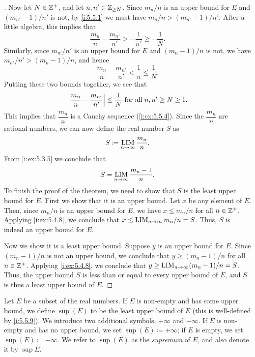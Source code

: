\begin{proof}[]
  Now let \(N \in \mathbb{Z}^+\), and let \(n, n' \in \mathbb{Z}_{\geq N}\).
  Since \(m_n / n\) is an upper bound for \(E\) and \((m_{n'} - 1) / n'\) is not, by \cref{i:5.5.1} we must have \(m_n / n > (m_{n'} - 1) / n'\).
  After a little algebra, this implies that
  \[
    \dfrac{m_n}{n} - \dfrac{m_{n'}}{n'} > -\dfrac{1}{n'} \geq -\dfrac{1}{N}.
  \]
  Similarly, since \(m_{n'} / n'\) is an upper bound for \(E\) and \((m_n - 1) / n\) is not, we have \(m_{n'} / n' > (m_n - 1) / n\), and hence
  \[
    \dfrac{m_n}{n} - \dfrac{m_{n'}}{n'} < \dfrac{1}{n} \leq \dfrac{1}{N}.
  \]
  Putting these two bounds together, we see that
  \[
    \left\lvert\dfrac{m_n}{n} - \dfrac{m_{n'}}{n'}\right\rvert \leq \dfrac{1}{N} \text{ for all } n, n' \geq N \geq 1.
  \]
  This implies that \(\dfrac{m_n}{n}\) is a Cauchy sequence (\cref{i:ex:5.5.4}).
  Since the \(\dfrac{m_n}{n}\) are rational numbers, we can now define the real number \(S\) as
  \[
    S \coloneqq \operatorname*{LIM}_{n \to \infty} \dfrac{m_n}{n}.
  \]
  From \cref{i:ex:5.3.5} we conclude that
  \[
    S = \operatorname*{LIM}_{n \to \infty} \dfrac{m_n - 1}{n}.
  \]
  To finish the proof of the theorem, we need to show that \(S\) is the least upper bound for \(E\).
  First we show that it is an upper bound.
  Let \(x\) be any element of \(E\).
  Then, since \(m_n / n\) is an upper bound for \(E\), we have \(x \leq m_n / n\) for all \(n \in \mathbb{Z}^+\).
  Applying \cref{i:ex:5.4.8}, we conclude that \(x \leq \operatorname*{LIM}_{n \to \infty} m_n / n = S\).
  Thus, \(S\) is indeed an upper bound for \(E\).

  Now we show it is a least upper bound.
  Suppose \(y\) is an upper bound for \(E\).
  Since \((m_n - 1) / n\) is not an upper bound, we conclude that \(y \geq (m_n - 1) / n\) for all \(n \in \mathbb{Z}^+\).
  Applying \cref{i:ex:5.4.8}, we conclude that \(y \geq \operatorname*{LIM}_{n \to \infty} (m_n - 1) / n = S\).
  Thus, the upper bound \(S\) is less than or equal to every upper bound of \(E\), and \(S\) is thus a least upper bound of \(E\).
\end{proof}

\begin{defn}[Supremum]\label{i:5.5.10}
  Let \(E\) be a subset of the real numbers.
  If \(E\) is non-empty and has some upper bound, we define \(\sup(E)\) to be the least upper bound of \(E\)
  (this is well-defined by \cref{i:5.5.9}).
  We introduce two additional symbols, \(+\infty\) and \(-\infty\).
  If \(E\) is non-empty and has no upper bound, we set \(\sup(E) \coloneqq +\infty\);
  if \(E\) is empty, we set \(\sup(E) \coloneqq -\infty\).
  We refer to \(\sup(E)\) as the \emph{supremum} of \(E\), and also denote it by \(\sup E\).
\end{defn}

